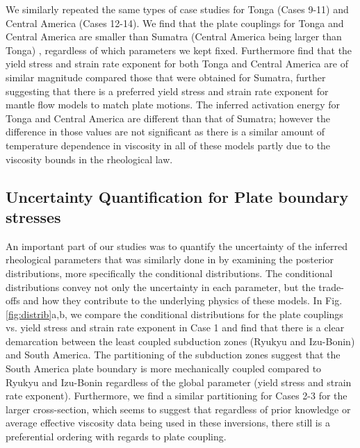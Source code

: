 \documentclass[12pt]{article}
\begin{document}
We similarly repeated the same types of case studies for Tonga (Cases 9-11) and Central America (Cases 12-14). We find that the plate couplings for Tonga and Central America are smaller than Sumatra (Central America being larger than Tonga) , regardless of which parameters we kept fixed. Furthermore find that the yield stress and strain rate exponent for both Tonga and Central America are of similar magnitude compared those that were obtained for Sumatra, further suggesting that there is a preferred yield stress and strain rate exponent for mantle flow models to match plate motions. The inferred activation energy for Tonga and Central America are different than that of Sumatra; however the difference in those values are not significant as there is a similar amount of temperature dependence in viscosity in all of these models partly due to the viscosity bounds in the rheological law.







\subsection*{Uncertainty Quantification for Plate boundary stresses}

An important part of our studies was to quantify the uncertainty of the inferred rheological parameters that was similarly done in \citep{ratnaswamy2015adjoint} by examining the posterior distributions, more specifically the conditional distributions. The conditional distributions convey not only the uncertainty in each parameter, but the trade-offs and how they contribute to the underlying physics of these models. In Fig.\ref{fig:distrib}a,b, we compare the conditional distributions for the plate couplings vs. yield stress and strain rate exponent in Case 1 and find that there is a clear demarcation between the least coupled subduction zones (Ryukyu and Izu-Bonin) and South America. The partitioning of the subduction zones suggest that the South America plate boundary is more mechanically coupled compared to Ryukyu and Izu-Bonin regardless of the global parameter (yield stress and strain rate exponent). Furthermore, we find a similar partitioning for Cases 2-3 for the larger cross-section, which seems to suggest that regardless of prior knowledge or average effective viscosity data being used in these inversions, there still is a preferential ordering with regards to plate coupling. 
\end{document}
